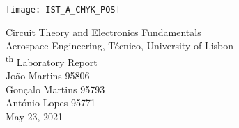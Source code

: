 
\thispagestyle {empty}

\texttt{[image: IST\_A\_CMYK\_POS]}

\begin{center}
%
\vspace{1.0cm}

\vspace{1cm}
{\FontLb Circuit Theory and Electronics Fundamentals} \\ %
\vspace{1cm}
{\FontSn Aerospace Engineering, Técnico, University of Lisbon} \\ %
\vspace{1cm}
{\textsuperscript{th} Laboratory Report} \\
\vspace{1cm}
{\FontSn João Martins 95806} \\
{\FontSn Gonçalo Martins 95793}\\
{\FontSn António Lopes 95771}\\
\vspace{1cm}
{\FontSn May 23, 2021} \\ %
%
\end{center}

